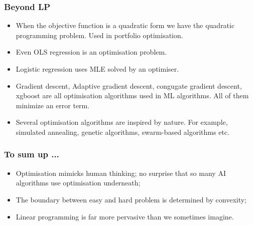 \documentclass{beamer}
\begin{document}
\begin{frame}
\frametitle{Beyond LP}
\begin{itemize}
\item When the objective function is a quadratic form we have the quadratic 
programming problem. Used in portfolio optimisation.
\item Even OLS regression is an optimisation problem.
\item Logistic regression uses MLE solved by an optimiser.
\item Gradient descent, Adaptive gradient descent, congugate gradient descent,
xgboost are all optimisation algorithms used in ML algorithms. All of them 
minimize an error term.
\item Several optimisation algorithms are inspired by nature. For example,
simulated annealing, genetic algorithms, swarm-based algorithms etc.
\end{itemize}
\end{frame}

\begin{frame}
\frametitle{To sum up ...}
\begin{itemize}
\item Optimisation mimicks human thinking; no surprise that so many AI
algorithms use optimisation underneath;
\item The boundary between easy and hard problem is determined by convexity;
\item Linear programming is far more pervasive than we sometimes imagine.
\end{itemize}
\end{frame}
\end{document}
